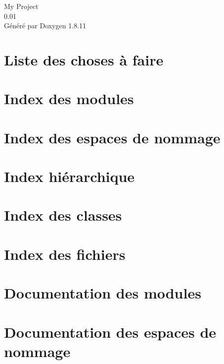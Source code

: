 \documentclass[twoside]{book}
\newcommand{\+}{\discretionary{\mbox{\scriptsize$\hookleftarrow$}}{}{}}
\newcommand{\clearemptydoublepage}{%
  \newpage{\pagestyle{empty}\cleardoublepage}%
}
\begin{document}
\hypersetup{pageanchor=false,
             bookmarksnumbered=true,
             pdfencoding=unicode
            }
\begin{titlepage}
\vspace*{7cm}
\begin{center}%
{\Large My Project \\[1ex]\large 0.\+01 }\\
\vspace*{1cm}
{\large Généré par Doxygen 1.8.11}\\
\end{center}
\end{titlepage}
\clearemptydoublepage
\tableofcontents
\clearemptydoublepage
{}
\hypersetup{pageanchor=true}

\chapter{Liste des choses à faire}
\label{todo}
\hypertarget{todo}{}

\chapter{Index des modules}

\chapter{Index des espaces de nommage}

\chapter{Index hiérarchique}

\chapter{Index des classes}

\chapter{Index des fichiers}

\chapter{Documentation des modules}

\chapter{Documentation des espaces de nommage}



\end{document}
